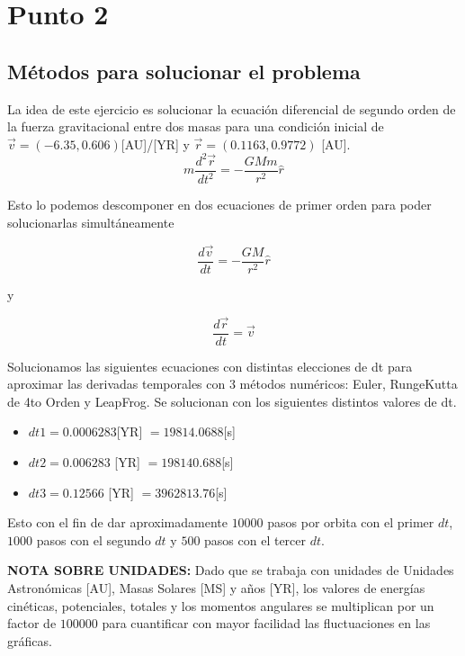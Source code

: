 \documentclass{article}
\begin{document}
\pagebreak

\section*{Punto 2}

\subsection*{M\'etodos para solucionar el problema}
La idea de este ejercicio es solucionar la ecuaci\'on diferencial de segundo orden de la fuerza gravitacional entre dos masas para una condici\'on inicial de $\Vec{v} = (-6.35,0.606) $[AU]/[YR] y $\Vec{r} = (0.1163,0.9772)$ [AU].
\begin{equation*}
   m \frac{d^2 \Vec{r}}{dt^2} = -\frac{GMm }{r^2} \hat{r}
\end{equation*}

Esto lo podemos descomponer en dos ecuaciones de primer orden para poder solucionarlas simult\'aneamente

\begin{equation*}
    \frac{d \Vec{v}}{dt} = -\frac{GM }{r^2} \hat{r}
\end{equation*}

y

\begin{equation*}
    \frac{d\Vec{r}}{dt} = \Vec{v}
\end{equation*}

Solucionamos las siguientes ecuaciones con distintas elecciones de dt para aproximar las derivadas temporales con 3 m\'etodos num\'ericos: Euler, RungeKutta de 4to Orden y LeapFrog. Se solucionan con los siguientes distintos valores de dt. 
\begin{itemize}
    \item $dt1=0.0006283 $[YR] $= 19814.0688$[s]
    \item $dt2 = 0.006283$ [YR] $= 198140.688$[s]
    \item $dt3 = 0.12566$ [YR] $= 3962813.76$[s]
\end{itemize}

Esto con el fin de dar aproximadamente $10000$ pasos por orbita con el primer $dt$, $1000$ pasos con el segundo $dt$ y $500$ pasos con el tercer $dt$.

\textbf{NOTA SOBRE UNIDADES: }Dado que se trabaja con unidades de Unidades Astron\'omicas [AU], Masas Solares [MS] y a\~nos [YR], los valores de energ\'ias cin\'eticas, potenciales, totales y los momentos angulares se  multiplican  por un factor de $100000$ para cuantificar con mayor facilidad las fluctuaciones en las gr\'aficas.
\end{document}
